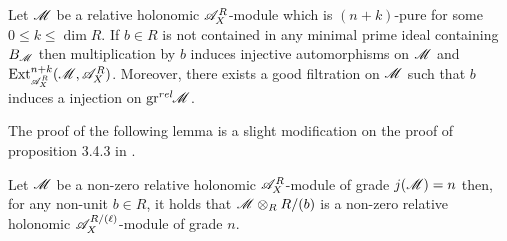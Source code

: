 \begin{lemma}\label{lem: NotBernsteinInjectiveAutomorphism}
  Let $\mathscr{M}$ be a relative holonomic $\mathscr{A}_X^R$-module which is $(n+k)$-pure for some $0\leq k \leq \dim R$. If $b\in R$ is not contained in any minimal prime ideal containing $B_{\mathscr{M}}$ then multiplication by $b$ induces injective automorphisms on $\mathscr{M}$ and $\Ex{\A_X^R}{n+k}(\M,\A_X^R)$. Moreover, there exists a good filtration on $\mathscr{M}$ such that $b$ induces a injection on $\operatorname{gr}^{rel}\mkern-5mu \mathscr{M}$.
\end{lemma}
The proof of the following lemma is a slight modification on the proof of proposition 3.4.3 in \cite{budur2019zero}.
\begin{lemma}\label{lem: RestrictToCM}
  Let $\mathscr{M}$ be a non-zero relative holonomic $\mathscr{A}_X^R$-module of grade $j(\mathscr{M}) = n$  then, for any non-unit $b\in R$, it holds that $\mathscr{M} \otimes_R R/(b)$ is a non-zero relative holonomic  $\mathscr{A}_X^{R/(\ell)}$-module of grade $n$.
\end{lemma}
